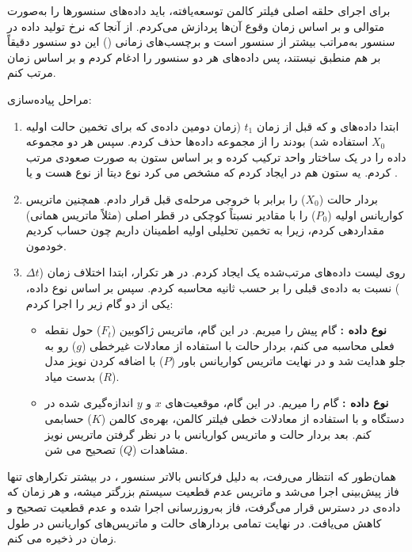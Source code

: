 \documentclass[12pt,a4paper]{article}
\begin{document}
برای اجرای حلقه اصلی فیلتر کالمن توسعه‌یافته، باید داده‌های سنسورها را به‌صورت متوالی و بر اساس زمان وقوع آن‌ها پردازش می‌کردم. از آنجا که نرخ تولید داده در سنسور  به‌مراتب بیشتر از سنسور  است و برچسب‌های زمانی () این دو سنسور دقیقاً بر هم منطبق نیستند، پس داده‌های هر دو سنسور را ادغام کردم و بر اساس زمان مرتب کنم. 

مراحل پیاده‌سازی:

\begin{enumerate}
	\item ابتدا داده‌های  و  که قبل از زمان $t_1$ (زمان دومین داده‌ی  که برای تخمین حالت اولیه $X_0$ استفاده شد) بودند را از مجموعه داده‌ها حذف کردم. سپس هر دو مجموعه داده را در یک ساختار واحد ترکیب کرده و بر اساس ستون  به صورت صعودی مرتب کردم. یه ستون هم در  ایجاد کردم که مشخص می کرد نوع دیتا از نوع هست و یا .
	
	\item بردار حالت ($X_0$) را برابر با خروجی مرحله‌ی قبل قرار دادم. همچنین ماتریس کواریانس اولیه ($P_0$) را با مقادیر نسبتاً کوچکی در قطر اصلی (مثلاً ماتریس همانی) مقداردهی کردم، زیرا به تخمین تحلیلی اولیه اطمینان داریم چون حساب کردیم خودمون.
	
	\item روی لیست داده‌های مرتب‌شده یک  ایجاد کردم. در هر تکرار، ابتدا اختلاف زمان ($\Delta t$) نسبت به داده‌ی قبلی را بر حسب ثانیه محاسبه کردم. سپس بر اساس نوع داده، یکی از دو گام زیر را اجرا کردم:
	\begin{itemize}
		\item \textbf{نوع داده :} گام پیش‌  را میریم. در این گام، ماتریس ژاکوبین ($F_t$) حول نقطه فعلی محاسبه می کنم، بردار حالت با استفاده از معادلات  غیرخطی ($g$) رو به جلو هدایت شد و در نهایت ماتریس کواریانس باور ($P$) با اضافه کردن نویز مدل ($R$) بدست میاد.
		\item \textbf{نوع داده :} گام   را میریم. در این گام، موقعیت‌های $x$ و $y$ اندازه‌گیری شده در دستگاه  و با استفاده از معادلات خطی فیلتر کالمن، بهره‌ی کالمن ($K$) حسابمی کنم. بعد بردار حالت و ماتریس کواریانس با در نظر گرفتن ماتریس نویز مشاهدات ($Q$) تصحیح می شن.
	\end{itemize}
\end{enumerate}

همان‌طور که انتظار می‌رفت، به دلیل فرکانس بالاتر سنسور ، در بیشتر تکرارهای تنها فاز پیش‌بینی اجرا می‌شد و ماتریس عدم قطعیت سیستم بزرگتر میشه، و هر زمان که داده‌ی  در دسترس قرار می‌گرفت، فاز به‌روزرسانی اجرا شده و عدم قطعیت تصحیح و کاهش می‌یافت. در نهایت تمامی بردارهای حالت و ماتریس‌های کواریانس در طول زمان در  ذخیره می کنم.
\end{document}
